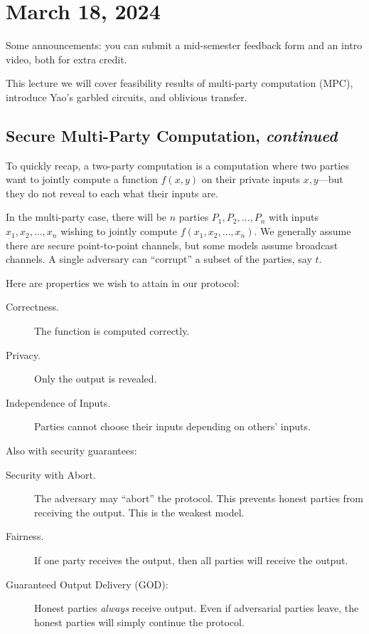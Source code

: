 \section{March 18, 2024}
\label{20240318}

Some announcements: you can submit a mid-semester feedback form and an intro video, both for extra credit.

This lecture we will cover feasibility results of multi-party computation (MPC), introduce Yao's garbled circuits, and oblivious transfer.

\subsection{Secure Multi-Party Computation, \emph{continued}}
To quickly recap, a two-party computation is a computation where two parties want to jointly compute a function $f(x, y)$ on their private inputs $x, y$---but they do not reveal to each what their inputs are.

In the multi-party case, there will be $n$ parties $P_1, P_2, \dots, P_n$ with inputs $x_1, x_2, \dots, x_n$ wishing to jointly compute $f(x_1, x_2, \dots, x_n)$. We generally assume there are secure point-to-point channels, but some models assume broadcast channels. A single adversary can ``corrupt'' a subset of the parties, say $t$.

Here are properties we wish to attain in our protocol:
\begin{description}
    \item[Correctness.] The function is computed correctly.
    \item[Privacy.] Only the output is revealed.
    \item[Independence of Inputs.] Parties cannot choose their inputs depending on others' inputs.
\end{description}
Also with security guarantees:
\begin{description}
    \item[Security with Abort.] The adversary may ``abort'' the protocol. This prevents honest parties from receiving the output. This is the weakest model.
    \item[Fairness.] If one party receives the output, then all parties will receive the output.
    \item[Guaranteed Output Delivery (GOD):] Honest parties \emph{always} receive output. Even if adversarial parties leave, the honest parties will simply continue the protocol.
\end{description}

